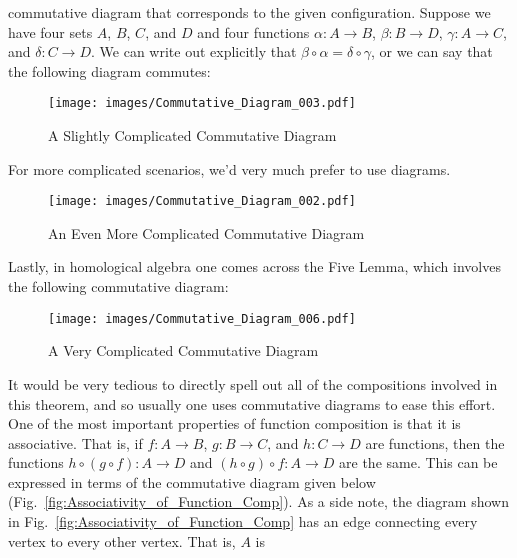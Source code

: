         commutative diagram that corresponds to the given configuration.
        Suppose we have four sets $A$, $B$, $C$, and $D$ and four functions
        $\alpha:A\rightarrow{B}$, $\beta:B\rightarrow{D}$,
        $\gamma:A\rightarrow{C}$, and $\delta:C\rightarrow{D}$. We can write out
        explicitly that $\beta\circ\alpha=\delta\circ\gamma$, or we can say that
        the following diagram commutes:
        \begin{figure}[H]
            \centering
            \captionsetup{type=figure}
            \texttt{[image: images/Commutative\_Diagram\_003.pdf]}
            \caption{A Slightly Complicated Commutative Diagram}
            \label{fig:Commutative_Diagram_Func_Comp_001}
        \end{figure}
        For more complicated scenarios, we'd very much prefer to use diagrams.
        \begin{figure}[H]
            \centering
            \captionsetup{type=figure}
            \texttt{[image: images/Commutative\_Diagram\_002.pdf]}
            \caption{An Even More Complicated Commutative Diagram}
            \label{fig:Commutative_Diagram_Func_Comp_002}
        \end{figure}
        Lastly, in homological algebra one comes
        across the Five Lemma, which involves the
        following commutative diagram:
        \begin{figure}[H]
            \centering
            \captionsetup{type=figure}
            \texttt{[image: images/Commutative\_Diagram\_006.pdf]}
            \caption{A Very Complicated Commutative Diagram}
            \label{fig:Commutative_Diagram_Func_Comp_003}
        \end{figure}
        It would be very tedious to directly spell out all of the compositions
        involved in this theorem, and so usually one uses commutative diagrams
        to ease this effort. One of the most important properties of function
        composition is that it is associative. That is, if $f:A\rightarrow{B}$,
        $g:B\rightarrow{C}$, and $h:C\rightarrow{D}$ are functions, then the
        functions $h\circ(g\circ{f}):A\rightarrow{D}$ and
        $(h\circ{g})\circ{f}:A\rightarrow{D}$ are the same. This can be
        expressed in terms of the commutative diagram given below
        (Fig.~\ref{fig:Associativity_of_Function_Comp}). As a side note, the
        diagram shown in Fig.~\ref{fig:Associativity_of_Function_Comp} has an
        edge connecting every vertex to every other vertex. That is, $A$ is
